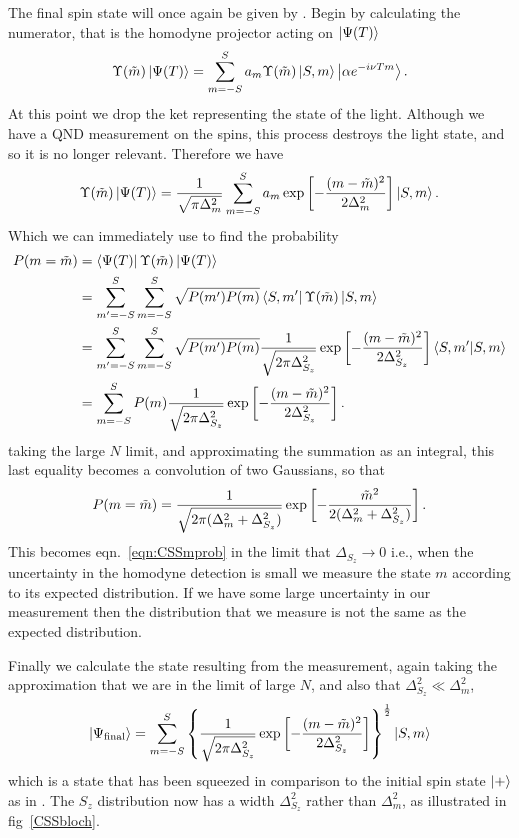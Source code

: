 The final spin state will once again be given by
. Begin by calculating the numerator, that is
the homodyne projector acting on $\ket{\Psi(T)}$
%
\begin{equation}
  \Upsilon(\tilde{m})\ket{\Psi(T)} =
  \sum_{m=-S}^{S}a_m\Upsilon(\tilde{m})\ket{S,m}\ket{\alpha e^{-i\nu Tm}}.
\end{equation}
%
At this point we drop the ket representing the state of the light. Although we
have a QND measurement on the spins, this process destroys the light state, and
so it is no longer relevant. Therefore we have
%
\begin{equation}
  \Upsilon(\tilde{m}) \ket{\Psi(T)} =
  \frac{1}{\sqrt{\pi\Delta_m^2}}\sum_{m=-S}^S a_m \exp\left[
    -\frac{(m-\tilde{m})^2}{2\Delta_m^2}\right]\ket{S,m}.
\end{equation}
%
Which we can immediately use to find the probability
%
\begin{align}
  P(m=\tilde{m}) &= \bra{\Psi(T)}\Upsilon(\tilde{m})\ket{\Psi(T)}\\
  & = \sum_{m'=-S}^S \sum_{m=-S}^S \sqrt{P(m')P(m)}\bra{S,
  m'}\Upsilon(\tilde{m})\ket{S, m} \\
  & = \sum_{m'=-S}^S \sum_{m=-S}^S \sqrt{P(m')P(m)}
  \frac{1}{\sqrt{2\pi\Delta_{S_z}^2}}\exp\left[-\frac{(m-\tilde{m})^2}{2\Delta_{S_z}^2}\right] 
  \bra{S, m'}\ket{S, m} \\
  &= \sum_{m=-S}^{S} P(m) 
  \frac{1}{\sqrt{2\pi\Delta_{S_z}^2}}\exp\left[-\frac{(m-\tilde{m})^2}{2\Delta_{S_z}^2}\right] .
\end{align}
%
taking the large $N$ limit, and approximating the summation as an integral,
this last equality becomes a convolution of two Gaussians, so that
%
\begin{equation}
  P(m=\tilde{m}) = \frac{1}{\sqrt{2\pi(\Delta_m^2 + \Delta_{S_z}^2)}}\exp\left[
    -\frac{\tilde{m}^2}{2(\Delta_m^2 + \Delta_{S_z}^2)}\right].
\end{equation}
%
This becomes eqn.~\ref{eqn:CSSmprob} in the limit that $\Delta_{S_z} \to 0$
i.e., when the uncertainty in the homodyne detection is small we measure the
state $m$ according to its expected distribution. If we have some large
uncertainty in our measurement then the distribution that we measure is not the
same as the expected distribution.

Finally we calculate the state resulting from the measurement, again taking the
approximation that we are in the limit of large $N$, and also that
$\Delta_{S_z}^2 \ll \Delta_m^2$,
%
\begin{equation}
  \ket{\Psi_\text{final}} =
  \sum_{m=-S}^S\left\{\frac{1}{\sqrt{2\pi\Delta_{S_z}^2}} \exp\left[-\frac{(m -
  \tilde{m})^2}{2\Delta_{S_z}^2}\right]\right\}^\frac{1}{2} \ket{S,m}
\end{equation}
%
which is a state that has been squeezed in comparison to the initial spin state
$\ket{+}$ as in . The $S_z$ distribution now has
a width $\Delta_{S_z}^2$ rather than $\Delta_m^2$, as illustrated in
fig~\ref{CSSbloch}.

